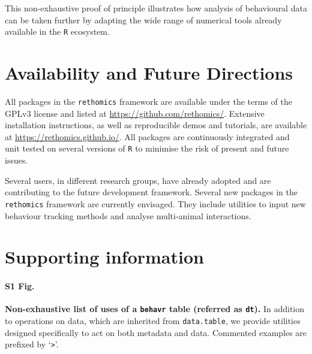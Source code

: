 \documentclass[10pt,letterpaper]{article}\usepackage[]{graphicx}\usepackage[]{color}
\begin{document}
This non-exhaustive proof of principle illustrates how analysis of behavioural data can be taken further by adapting the wide range of numerical tools already available in the \texttt{R} ecosystem. 




% 

\section*{Availability and Future Directions}
All packages in the \texttt{rethomics} framework are available under the terms of the GPLv3 license and listed at
\href{https://github.com/rethomics}{https://github.com/rethomics/}.
Extensive installation instructions, as well as reproducible demos and tutorials, are available at
\href{https://rethomics.github.io/}{https://rethomics.github.io/}.
All packages are continuously integrated and unit tested on several versions of \texttt{R} to minimise the risk of present and future issues.

Several users, in different research groups, have already adopted and are contributing to the future development framework.
Several new packages in the \texttt{rethomics} framework are currently envisaged. 
They include utilities to input new behaviour tracking methods and analyse multi-animal interactions.

\section*{Supporting information}



\paragraph*{S1 Fig.}
\label{S1-Fig}
{\bf Non-exhaustive list of uses of a \texttt{behavr} table (referred as \texttt{dt}).}
In addition to operations on data, which are inherited from \texttt{data.table},
we provide utilities designed specifically to act on both metadata and data.  
Commented examples are prefixed by `\texttt{>}'.
\end{document}
